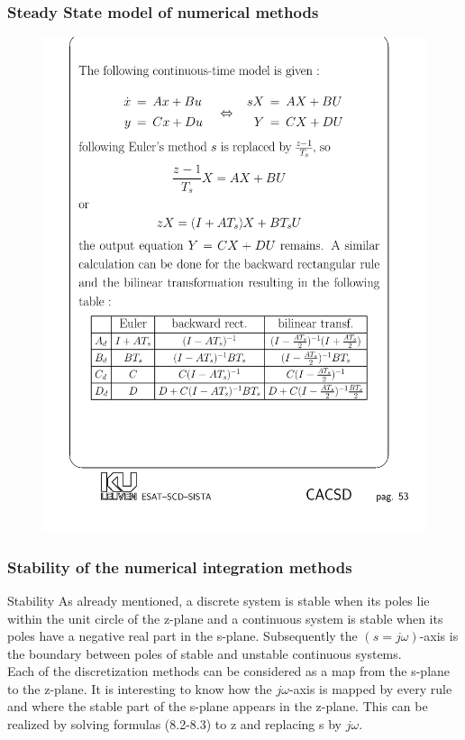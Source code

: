 \begin{frame}
	\frametitle{Steady State model of numerical methods}
	\begin{center}
		\begin{figure}
			\centering
			\includegraphics[width=1\linewidth]{Steady_State}
		\end{figure}
	\end{center}
\end{frame}

\begin{frame}
	\frametitle{Stability of the numerical integration methods}
	\begin{block}{Stability}
		As already mentioned, a discrete system is stable when its poles lie within the unit circle of the z-plane and a continuous system is stable when its poles have a negative real part in the s-plane. Subsequently the $(s=j\omega)$-axis is the boundary between poles of stable and unstable continuous systems.\\
		\vspace{1em}
		Each of the discretization methods can be considered as a map from the s-plane to the z-plane. It is interesting to know how the $j\omega$-axis is mapped by every rule and where the stable part of the s-plane appears in the z-plane. This can be realized by solving formulas (8.2-8.3) to z and replacing s by $j\omega$. 
	\end{block}
\end{frame}

